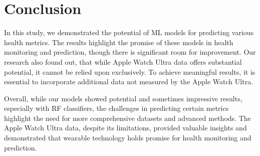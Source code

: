 \section{Conclusion}

In this study, we demonstrated the potential of ML models for predicting various health metrics. The results highlight the promise of these models in health monitoring and prediction, though there is significant room for improvement. Our research also found out, that while Apple Watch Ultra data offers substantial potential, it cannot be relied upon exclusively. To achieve meaningful results, it is essential to incorporate additional data not measured by the Apple Watch Ultra.

Overall, while our models showed potential and sometimes impressive results, especially with RF classifiers, the challenges in predicting certain metrics highlight the need for more comprehensive datasets and advanced methods. The Apple Watch Ultra data, despite its limitations, provided valuable insights and demonstrated that wearable technology holds promise for health monitoring and prediction.